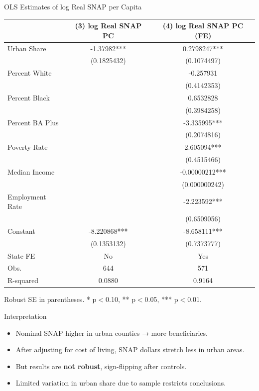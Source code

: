 \documentclass{beamer}
\begin{document}
\begin{frame}{OLS Estimates of log Real SNAP per Capita}
\tiny
\centering

\begin{tabular}{lcc}
\hline
 & (3) log Real SNAP PC & (4) log Real SNAP PC (FE) \\
\hline
Urban Share      & -1.37982***  & 0.2798247*** \\
                 & (0.1825432)  & (0.1074497) \\
Percent White    &              & -0.257931 \\
                 &              & (0.4142353) \\
Percent Black    &              & 0.6532828 \\
                 &              & (0.3984258) \\
Percent BA Plus  &              & -3.335995*** \\
                 &              & (0.2074816) \\
Poverty Rate     &              & 2.605094*** \\
                 &              & (0.4515466) \\
Median Income    &              & -0.00000212*** \\
                 &              & (0.000000242) \\
Employment Rate  &              & -2.223592*** \\
                 &              & (0.6509056) \\
Constant         & -8.220868*** & -8.658111*** \\
                 & (0.1353132)  & (0.7373777) \\
\hline
State FE         & No           & Yes \\
Obs.             & 644          & 571 \\
R-squared        & 0.0880       & 0.9164 \\
\hline
\end{tabular}

\vspace{2mm}
\scriptsize Robust SE in parentheses. * p$<$0.10, ** p$<$0.05, *** p$<$0.01.
\end{frame}
\begin{frame}{Interpretation}
\begin{itemize}
    \item Nominal SNAP higher in urban counties → more beneficiaries.
    \item After adjusting for cost of living, SNAP dollars stretch less in urban areas.
    \item But results are \textbf{not robust}, sign-flipping after controls.
    \item Limited variation in urban share due to sample restricts conclusions.
\end{itemize}
\end{frame}
\end{document}
